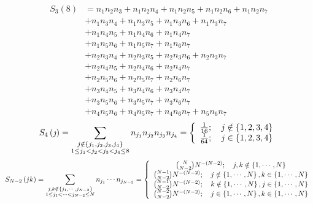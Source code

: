 \documentclass[aps,preprint]{revtex4}%
\begin{document}
\begin{align}
S_{3}\left(  8\right)   &  =n_{1}n_{2}n_{3}+n_{1}n_{2}n_{4}+n_{1}n_{2}%
n_{5}+n_{1}n_{2}n_{6}+n_{1}n_{2}n_{7}\\
&  +n_{1}n_{3}n_{4}+n_{1}n_{3}n_{5}+n_{1}n_{3}n_{6}+n_{1}n_{3}n_{7}\\
&  +n_{1}n_{4}n_{5}+n_{1}n_{4}n_{6}+n_{1}n_{4}n_{7}\\
&  +n_{1}n_{5}n_{6}+n_{1}n_{5}n_{7}+n_{1}n_{6}n_{7}\\
&  +n_{2}n_{3}n_{4}+n_{2}n_{3}n_{5}+n_{2}n_{3}n_{6}+n_{2}n_{3}n_{7}\\
&  +n_{2}n_{4}n_{5}+n_{2}n_{4}n_{6}+n_{2}n_{4}n_{7}\\
&  +n_{2}n_{5}n_{6}+n_{2}n_{5}n_{7}+n_{2}n_{6}n_{7}\\
&  +n_{3}n_{4}n_{5}+n_{3}n_{4}n_{6}+n_{3}n_{4}n_{7}\\
&  +n_{3}n_{5}n_{6}+n_{3}n_{5}n_{7}+n_{3}n_{6}n_{7}\\
&  +n_{4}n_{5}n_{6}+n_{4}n_{5}n_{7}+n_{4}n_{6}n_{7}+n_{5}n_{6}n_{7}%
\end{align}%
\begin{equation}
S_{4}\left(  \jmath\right)  =\sum_{\substack{j\notin\left\{  j_{1},j_{2}%
,j_{3},j_{4}\right\}  \\1\leq j_{1}<j_{2}<j_{3}<j_{4}\leq8}}n_{j_{1}}n_{j_{2}%
}n_{j_{3}}n_{j_{4}}=\left\{
\begin{array}
[c]{c}%
\frac{1}{16};\quad j\notin\left\{  1,2,3,4\right\} \\
\frac{1}{64};\quad j\in\left\{  1,2,3,4\right\}
\end{array}
\right.
\end{equation}%
\begin{equation}
S_{N-2}\left(  jk\right)  =\sum_{\substack{j,k\notin\left\{  j_{1}%
,\cdots,j_{N-2}\right\}  \\1\leq j_{1}<\cdots<j_{N-2}\leq N}}n_{j_{1}}\cdots
n_{j_{N-2}}=\left\{
\begin{array}
[c]{c}%
\binom{N}{N-2}N^{-\left(  N-2\right)  };\quad j,k\notin\left\{  1,\cdots
,N\right\} \\
\binom{N-1}{N-2}N^{-\left(  N-2\right)  };\quad j\notin\left\{  1,\cdots
,N\right\}  ,k\in\left\{  1,\cdots,N\right\} \\
\binom{N-1}{N-2}N^{-\left(  N-2\right)  };\quad k\notin\left\{  1,\cdots
,N\right\}  ,j\in\left\{  1,\cdots,N\right\} \\
\binom{N-2}{N-2}N^{-\left(  N-2\right)  };\quad j\in\left\{  1,\cdots
,N\right\}  ,k\in\left\{  1,\cdots,N\right\}
\end{array}
\right.
\end{equation}
\end{document}
